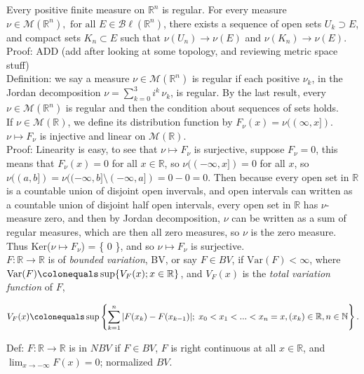 \documentclass[12pt]{article}
\newcommand{\fall}[0] { \textrm{ for all } }
\newcommand{\rarw}[0] { \rightarrow }
\newcommand{ \defeq }[0] { \colonequals }
\newcommand{\nats}[0] { \mathbb{N}}
\newcommand{\reals}[0] { \mathbb{R}}
\newcommand{\M}[0] { \mathcal{M} }
\newcommand{\Bl}[0] { \mathcal{B} \ell }
\newcommand{ \Var } { \textrm{Var} }
\begin{document}
Every positive finite measure on $\reals^n$ is regular. For every measure $\nu \in \M(\reals^n), \fall E \in \Bl(\reals^n)$, there exists a sequence of open sets $U_k \supset E$, and compact sets $K_n \subset E$ such that $\nu(U_n) \rarw \nu(E)$ and $\nu(K_n) \rarw \nu(E)$. \\

\noindent
Proof: ADD (add after looking at some topology, and reviewing metric space stuff)  \\

Definition: we say a measure $\nu \in \M(\reals^n)$ is regular if each positive $\nu_k$, in the Jordan decomposition $\nu = \sum_{k=0}^3 i^k \, \nu_k$, is regular. By the last result, every $\nu \in \M(\reals^n)$ is regular and then the condition about sequences of sets holds. \\

If $\nu \in \M(\reals)$, we define its distribution function by $F_\nu (x) = \nu((\infty,x])$. $\nu \mapsto F_\nu$ is injective and linear on $\M(\reals)$. \\

\noindent
Proof: Linearity is easy, to see that $\nu \mapsto F_\nu$ is surjective, suppose $F_\nu = 0$, this means that $F_\nu(x) = 0$ for all $x \in \reals$, so $\nu((-\infty, x]) = 0$ for all $x$, so $\nu((a,b]) = \nu((-\infty,b] \setminus (-\infty,a]) = 0 - 0 = 0$. Then because every open set in $\reals$ is a countable union of disjoint open invervals, and open intervals can written as a countable union of disjoint half open intervals, every open set in $\reals$ has $\nu$-measure zero, and then by Jordan decomposition, $\nu$ can be written as a sum of regular measures, which are then all zero measures, so $\nu$ is the zero measure. Thus Ker($\nu \mapsto F_\nu$) = \{ 0 \}, and so $\nu \mapsto F_\nu$ is surjective. \\


$F: \reals \rarw \reals$ is of \emph{bounded variation}, BV, or say $F \in BV$, if $\Var(F) < \infty$, where $\Var(F) \defeq \sup\{ V_F(x); x \in \reals \}$, and $V_F(x)$ is the \emph{total variation function} of $F$,

$$
V_F(x) \defeq \sup \left\{  \sum_{k=1}^n |F(x_k) - F(x_{k-1})| ; \;  x_0    < x_1 < ... < x_n=x, ( x_k ) \in \reals, n \in \nats \right\}.
$$

Def: $F: \reals \rarw \reals$ is in $NBV$ if $F \in BV$, $F$ is right continuous at all $x \in \reals$, and $\lim_{x \rarw -\infty} F(x) = 0$; normalized $BV$.\\
\end{document}

